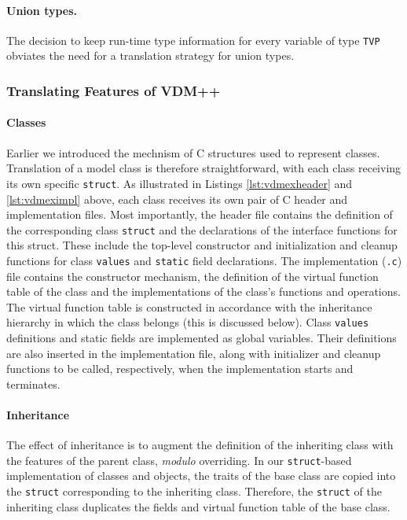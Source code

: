 \paragraph{Union types.}
The decision to keep run-time type information for every variable of type \texttt{TVP} obviates the need for a translation strategy for union types.
%
%
%
\subsubsection{Translating Features of VDM++}
\paragraph{Classes}
%
Earlier we introduced the mechnism of C structures used to represent classes.
%
Translation of a model class is therefore straightforward, with each class receiving its own specific \texttt{struct}.
%
As illustrated in Listings \ref{lst:vdmexheader} and \ref{lst:vdmeximpl} above, each class receives its own pair of C header and implementation files.
%
Most importantly, the header file contains the definition of the corresponding class \texttt{struct} and the declarations of the interface functions for this struct.
%
These include the top-level constructor and initialization and cleanup functions for class \texttt{values} and \texttt{static} field declarations.
%
The implementation (\texttt{.c}) file contains the constructor mechanism, the definition of the virtual function table of the class and the implementations of the class's functions and operations.
%
The virtual function table is constructed in accordance with the inheritance hierarchy in which the class belongs (this is discussed below).
%
Class \texttt{values} definitions and static fields are implemented as global variables.
%
Their definitions are also inserted in the implementation file, along with initializer and cleanup functions to be called, respectively, when the implementation starts and terminates.

\paragraph{Inheritance}
%
The effect of inheritance is to augment the definition of the inheriting class with the features of the parent class, \emph{modulo} overriding.
%
In our \texttt{struct}-based implementation of classes and objects, the traits of the base class are copied into the \texttt{struct} corresponding to the inheriting class.
%
Therefore, the \texttt{struct} of the inheriting class duplicates the fields and virtual function table of the base class.

